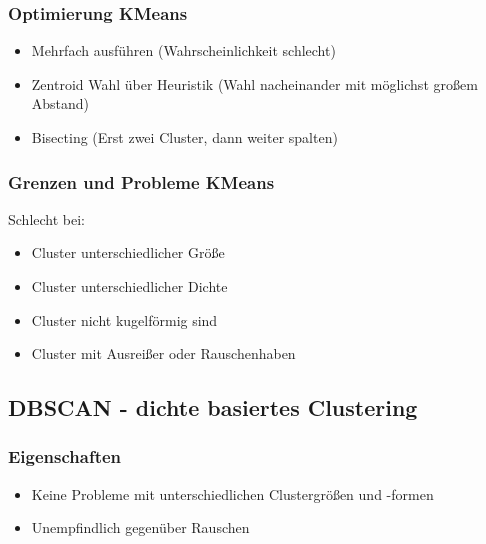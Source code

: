 \documentclass[a4paper]{article}
\begin{document}
\begin{landscape}
\begin{multicols}{3}
    \subsubsection{Optimierung KMeans}
    \begin{itemize}[noitemsep,nolistsep]
        \item Mehrfach ausführen (Wahrscheinlichkeit schlecht)
        \item Zentroid Wahl über Heuristik (Wahl nacheinander mit möglichst großem Abstand)
        \item Bisecting (Erst zwei Cluster, dann weiter spalten)
    \end{itemize}

    \subsubsection{Grenzen und Probleme KMeans}
    Schlecht bei:
    \begin{itemize}[noitemsep,nolistsep]
        \item Cluster unterschiedlicher Größe 
        \item Cluster unterschiedlicher Dichte 
        \item Cluster nicht kugelförmig sind 
        \item Cluster mit Ausreißer oder Rauschenhaben
    \end{itemize}


    \subsection{DBSCAN - dichte basiertes Clustering}

    \subsubsection{Eigenschaften}
    \begin{itemize}[noitemsep,nolistsep]
        \item Keine Probleme mit unterschiedlichen Clustergrößen und -formen
        \item Unempfindlich gegenüber Rauschen
    \end{itemize}



\end{multicols}
\end{landscape}
\end{document}
